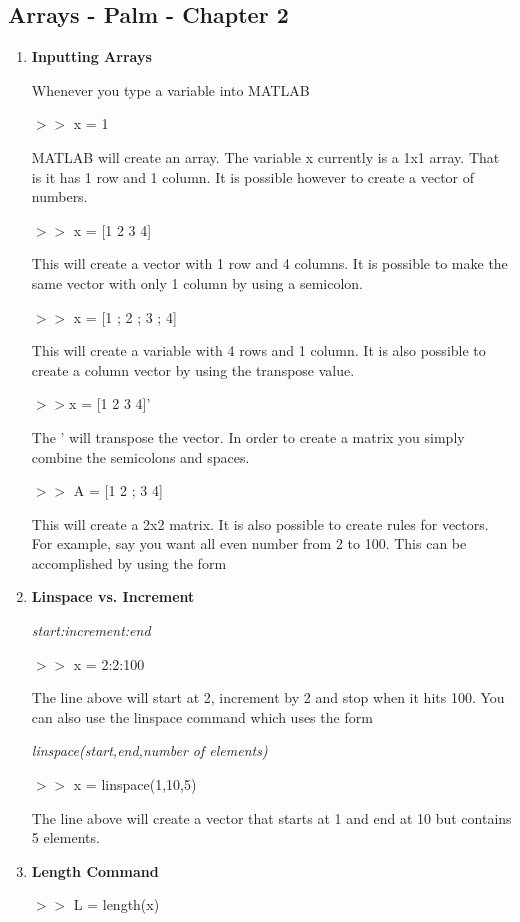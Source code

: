 \subsection{Arrays - Palm - Chapter 2}

\begin{enumerate}

\item \textbf{Inputting Arrays}

Whenever you type a variable into MATLAB 

$>>$ x = 1

MATLAB will create an array. The variable x currently is a 1x1
array. That is it has 1 row and 1 column. It is possible however to
create a vector of numbers.

$>>$ x = [1 2 3 4]

This will create a vector with 1 row and 4 columns. It is possible to
make the same vector with only 1 column by using a semicolon.

$>>$ x = [1 ; 2 ; 3 ; 4]

This will create a variable with 4 rows and 1 column. It is also
possible to create a column vector by using the transpose value.

$>>$x = [1 2 3 4]'

The ' will transpose the vector. In order to create a matrix you
simply combine the semicolons and spaces.

$>>$ A = [1 2 ; 3 4]

This will create a 2x2 matrix. It is also possible to create rules for
vectors. For example, say you want all even number from 2 to 100. This
can be accomplished by using the form

\item \textbf{Linspace vs. Increment}

{\it start:increment:end}

$>>$ x = 2:2:100

The line above will start at 2, increment by 2 and stop when it hits
100. You can also use the linspace command which uses the form

{\it linspace(start,end,number of elements)}

$>>$ x = linspace(1,10,5)

The line above will create a vector that starts at 1 and end at 10 but
contains 5 elements.

\item \textbf{Length Command}

$>>$ L = length(x)


\end{enumerate}
